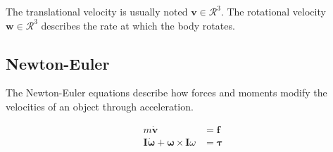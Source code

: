 The translational velocity is usually noted $\mathbf{v} \in \mathcal{R}^3$. The rotational velocity $\mathbf{w} \in \mathcal{R}^3$ describes the rate at which the body rotates.

\subsection{Newton-Euler}
The Newton-Euler equations describe how forces and moments modify the velocities of an object through acceleration.

\begin{align}
m\dot{\mathbf{v}} &= \mathbf{f} \label{eq:newton1}\\
\mathbf{I}\dot{\mathbf{\omega}} + \mathbf{\omega} \times \mathbf{I}\omega &= \mathbf{\tau}
\end{align}

